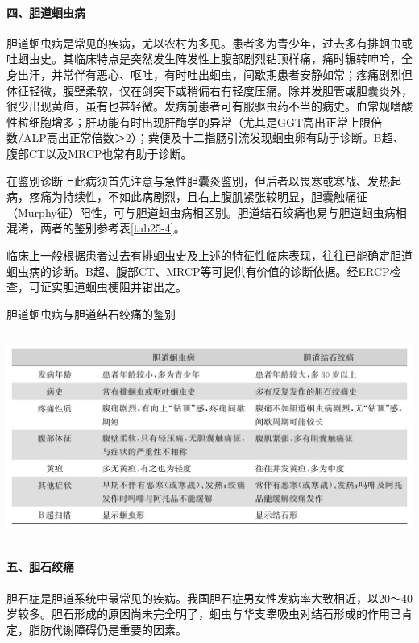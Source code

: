 \paragraph{四、胆道蛔虫病}

胆道蛔虫病是常见的疾病，尤以农村为多见。患者多为青少年，过去多有排蛔虫或吐蛔虫史。其临床特点是突然发生阵发性上腹部剧烈钻顶样痛，痛时辗转呻吟，全身出汗，并常伴有恶心、呕吐，有时吐出蛔虫，间歇期患者安静如常；疼痛剧烈但体征轻微，腹壁柔软，仅在剑突下或稍偏右有轻度压痛。除并发胆管或胆囊炎外，很少出现黄疸，虽有也甚轻微。发病前患者可有服驱虫药不当的病史。血常规嗜酸性粒细胞增多；肝功能有时出现肝酶学的异常（尤其是GGT高出正常上限倍数/ALP高出正常倍数＞2）；粪便及十二指肠引流发现蛔虫卵有助于诊断。B超、腹部CT以及MRCP也常有助于诊断。

在鉴别诊断上此病须首先注意与急性胆囊炎鉴别，但后者以畏寒或寒战、发热起病，疼痛为持续性，不如此病剧烈，且右上腹肌紧张较明显，胆囊触痛征（Murphy征）阳性，可与胆道蛔虫病相区别。胆道结石绞痛也易与胆道蛔虫病相混淆，两者的鉴别参考表\ref{tab25-4}。

临床上一般根据患者过去有排蛔虫史及上述的特征性临床表现，往往已能确定胆道蛔虫病的诊断。B超、腹部CT、MRCP等可提供有价值的诊断依据。经ERCP检查，可证实胆道蛔虫梗阻并钳出之。

\begin{table}[htbp]
\centering
\caption{胆道蛔虫病与胆道结石绞痛的鉴别}
\label{tab25-4}
\includegraphics[width=5.97917in,height=2.66667in]{./images/Image00144.jpg}
\end{table}

\paragraph{五、胆石绞痛}

胆石症是胆道系统中最常见的疾病。我国胆石症男女性发病率大致相近，以20～40岁较多。胆石形成的原因尚未完全明了，蛔虫与华支睾吸虫对结石形成的作用已肯定，脂肪代谢障碍仍是重要的因素。

